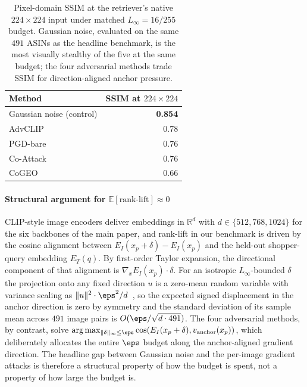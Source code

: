 \begin{table}[t]
\centering
\caption{Pixel-domain SSIM at the retriever's native $224 \times 224$ input under matched $L_\infty = 16/255$ budget. Gaussian noise, evaluated on the same $491$ ASINs as the headline benchmark, is the most visually stealthy of the five at the same budget; the four adversarial methods trade SSIM for direction-aligned anchor pressure.}
\label{sm:tab:gaussian-ssim}
\small
\begin{tabular}{lr}
\toprule
Method & SSIM at $224\times 224$ \\
\midrule
Gaussian noise (control) & \textbf{0.854} \\
AdvCLIP                  & 0.78 \\
PGD-bare                 & 0.76 \\
Co-Attack                & 0.76 \\
CoGEO                    & 0.66 \\
\bottomrule
\end{tabular}
\end{table}

\paragraph{Structural argument for $\mathbb{E}[\text{rank-lift}] \approx 0$} CLIP-style image encoders deliver embeddings in $\mathbb{R}^{d}$ with $d \in \{512, 768, 1024\}$ for the six backbones of the main paper, and rank-lift in our benchmark is driven by the cosine alignment between $E_I(x_p + \delta) - E_I(x_p)$ and the held-out shopper-query embedding $E_T(q)$. By first-order Taylor expansion, the directional component of that alignment is $\nabla_x E_I(x_p) \cdot \delta$. For an isotropic $L_\infty$-bounded $\delta$ the projection onto any fixed direction $u$ is a zero-mean random variable with variance scaling as $\lVert u\rVert^{2} \cdot \eps^{2}/d$~\cite{vershynin2018hd}, so the expected signed displacement in the anchor direction is zero by symmetry and the standard deviation of its sample mean across $491$ image pairs is $O(\eps/\sqrt{d \cdot 491})$. The four adversarial methods, by contrast, solve $\arg\max_{\lVert\delta\rVert_\infty\leq\eps}\cos(E_I(x_p+\delta), v_{\mathrm{anchor}}(x_p))$, which deliberately allocates the entire $\eps$ budget along the anchor-aligned gradient direction. The headline gap between Gaussian noise and the per-image gradient attacks is therefore a structural property of how the budget is spent, not a property of how large the budget is.


